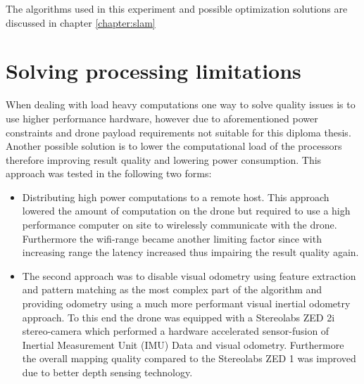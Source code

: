 The algorithms used in this experiment and possible optimization solutions are discussed in chapter \ref{chapter:slam}

\section{Solving processing limitations}
When dealing with load heavy computations one way to solve quality issues is to use higher performance hardware, however due to aforementioned power constraints and drone payload requirements not suitable for this diploma thesis. 
Another possible solution is to lower the computational load of the processors therefore improving result quality and lowering power consumption. 
This approach was tested in the following two forms:
\begin{itemize}
	
	\item Distributing high power computations to a remote host. This approach lowered the amount of computation on the drone but required to use a high performance computer on site to wirelessly communicate with the drone. Furthermore the wifi-range became another limiting factor since with increasing range the latency increased thus impairing the result quality again.
	
	\item The second approach was to disable visual odometry using feature extraction and pattern matching as the most complex part of the algorithm and providing odometry using a much more performant visual inertial odometry approach. To this end the drone was equipped with a Stereolabs ZED 2i stereo-camera which performed a hardware accelerated sensor-fusion of Inertial Measurement Unit (IMU) Data and visual odometry. Furthermore the overall mapping quality compared to the Stereolabs ZED 1 was improved due to better depth sensing technology. 
\end{itemize}

\filbreak